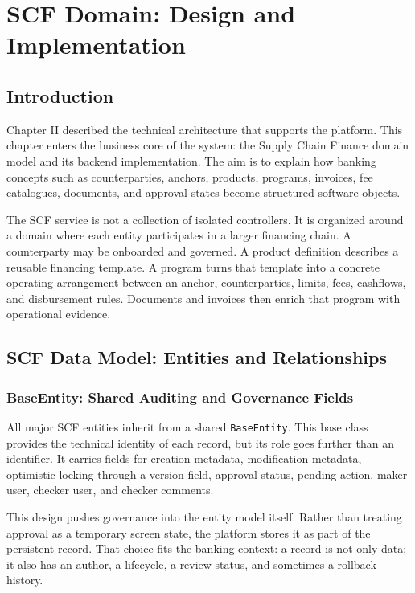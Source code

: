 \chapter{SCF Domain: Design and Implementation}
\label{chap:scf_domain}

\section{Introduction}
\label{sec:ch3_introduction}

Chapter II described the technical architecture that supports the platform. This chapter enters the business core of the system: the Supply Chain Finance domain model and its backend implementation. The aim is to explain how banking concepts such as counterparties, anchors, products, programs, invoices, fee catalogues, documents, and approval states become structured software objects.

The SCF service is not a collection of isolated controllers. It is organized around a domain where each entity participates in a larger financing chain. A counterparty may be onboarded and governed. A product definition describes a reusable financing template. A program turns that template into a concrete operating arrangement between an anchor, counterparties, limits, fees, cashflows, and disbursement rules. Documents and invoices then enrich that program with operational evidence.

\section{SCF Data Model: Entities and Relationships}
\label{sec:scf_data_model}

\subsection{BaseEntity: Shared Auditing and Governance Fields}
\label{subsec:base_entity}

All major SCF entities inherit from a shared \texttt{BaseEntity}. This base class provides the technical identity of each record, but its role goes further than an identifier. It carries fields for creation metadata, modification metadata, optimistic locking through a version field, approval status, pending action, maker user, checker user, and checker comments.

This design pushes governance into the entity model itself. Rather than treating approval as a temporary screen state, the platform stores it as part of the persistent record. That choice fits the banking context: a record is not only data; it also has an author, a lifecycle, a review status, and sometimes a rollback history.


